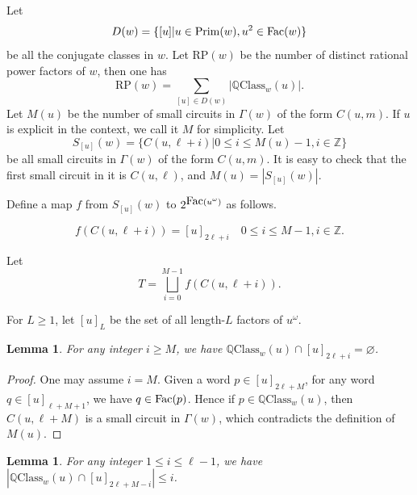 \documentclass[runningheads,envcountsame,a4paper]{llncs}
\newtheorem{lem}[thm]{Lemma}
\newcommand{\fac}{\hbox{\rm Fac}}
\newcommand{\pri}{\mathrm{Prim}}
\newcommand{\qcl}{\mathbb{Q}\mathrm{Class}}
\newcommand{\ZZ}{\mathbb{Z}}
\newcommand{\rp}{\mathrm{RP}}
\begin{document}
Let
$$D(w)=\{[u]|u\in\pri(w),u^2\in\fac(w)\}$$ 
be all the conjugate classes in $w$.
Let $\rp(w)$ be the number of distinct rational power factors of $w$, then one has
$$\rp(w)=\sum\limits_{[u]\in D(w)}|\qcl_w(u)|.$$
Let $M(u)$ be the number of small circuits in $\Gamma(w)$ of the form $C(u,m)$. If $u$ is explicit in the context, we call it $M$ for simplicity. Let 
$$S_{[u]}(w)=\{C(u,\ell+i)|0\le i\le M(u)-1, i\in\ZZ\}$$ 
be all small circuits in $\Gamma(w)$ of the form $C(u,m)$. It is easy to check that the first small circuit in it is $C(u,\ell)$, and $M(u)=|S_{[u]}(w)|$. 

Define a map $f$ from $S_{[u]}(w)$ to $2^{\fac(u^{\omega})}$ as follows. 

$$f(C(u,\ell+i))=[u]_{2\ell+i}\quad 0\le i\le M-1, i\in\ZZ.$$

Let 
$$T=\bigsqcup_{i=0}^{M-1} f(C(u,\ell+i)).$$

For $L\ge 1$, let $[u]_L$ be the set of all length-$L$ factors of $u^\omega$.

\begin{lem}\label{no long factors}
For any integer $i\ge M$, we have $\qcl_w(u) \cap [u]_{2\ell+i}=\varnothing $.
\end{lem}

\begin{proof}
One may assume $i=M$. Given a word $p\in [u]_{2\ell+M}$, for any word $q\in [u]_{\ell+M+1}$, we have $q\in\fac(p)$. Hence if $p\in\qcl_w(u)$, then $C(u,\ell+M)$ is a small circuit in $\Gamma(w)$, which contradicts the definition of $M(u)$.
\end{proof}

\begin{lem}\label{number of long rational factors}
For any integer $1\le i\le \ell-1$, we have $|\qcl_w(u) \cap [u]_{2\ell+M-i}|\le i$.
\end{lem}
\end{document}
